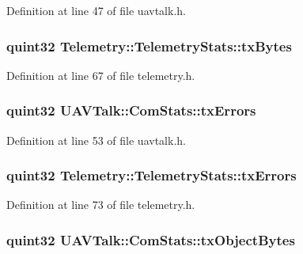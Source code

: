 \-Definition at line 47 of file uavtalk.\-h.

\hypertarget{group___u_a_v_talk_plugin_ga349d8c0f2aac815d79b13e54f818658c}{
\subsubsection[{tx\-Bytes}]{\setlength{\rightskip}{0pt plus 5cm}quint32 {\bf \-Telemetry\-::\-Telemetry\-Stats\-::tx\-Bytes}}}\label{group___u_a_v_talk_plugin_ga349d8c0f2aac815d79b13e54f818658c}


\-Definition at line 67 of file telemetry.\-h.

\hypertarget{group___u_a_v_talk_plugin_gaddc2324ebd5b83b73e1f873131efcccf}{
\subsubsection[{tx\-Errors}]{\setlength{\rightskip}{0pt plus 5cm}quint32 {\bf \-U\-A\-V\-Talk\-::\-Com\-Stats\-::tx\-Errors}}}\label{group___u_a_v_talk_plugin_gaddc2324ebd5b83b73e1f873131efcccf}


\-Definition at line 53 of file uavtalk.\-h.

\hypertarget{group___u_a_v_talk_plugin_gad6930d8f0e5a3c2e251c9600d1264c1a}{
\subsubsection[{tx\-Errors}]{\setlength{\rightskip}{0pt plus 5cm}quint32 {\bf \-Telemetry\-::\-Telemetry\-Stats\-::tx\-Errors}}}\label{group___u_a_v_talk_plugin_gad6930d8f0e5a3c2e251c9600d1264c1a}


\-Definition at line 73 of file telemetry.\-h.

\hypertarget{group___u_a_v_talk_plugin_gaf811665cd1c815ac65764deff354ba6c}{
\subsubsection[{tx\-Object\-Bytes}]{\setlength{\rightskip}{0pt plus 5cm}quint32 {\bf \-U\-A\-V\-Talk\-::\-Com\-Stats\-::tx\-Object\-Bytes}}}\label{group___u_a_v_talk_plugin_gaf811665cd1c815ac65764deff354ba6c}


